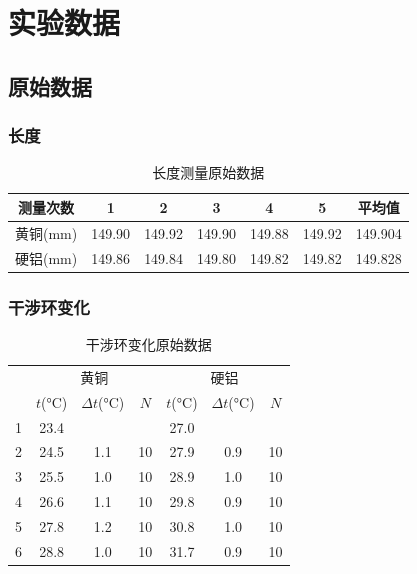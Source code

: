 \documentclass[a4paper,utf8]{article}
\begin{document}
\section{实验数据}
\subsection{原始数据}
\subsubsection{长度}
\begin{table}[!ht]
    \caption{长度测量原始数据}
    \begin{tabular}{*{7}{c}} \toprule
        测量次数 & 1 & 2 & 3 & 4 & 5 & 平均值  \\ \midrule
        黄铜(\unit{\mm}) & 149.90 & 149.92 & 149.90 & 149.88 & 149.92 & 149.904 \\ 
        硬铝(\unit{\mm}) & 149.86 & 149.84 & 149.80 & 149.82 & 149.82 & 149.828 \\ \bottomrule
    \end{tabular}
\end{table}
\subsubsection{干涉环变化}
\begin{table}[!ht]
    \caption{干涉环变化原始数据}
    \begin{tabular}{*{7}{c}}\toprule
        & \multicolumn{3}{c}{黄铜} & \multicolumn{3}{c}{硬铝} \\ 
        & $t$(\unit{\degreeCelsius}) & $\Delta t$(\unit{\degreeCelsius}) & $N$ & $t$(\unit{\degreeCelsius}) & $\Delta t$(\unit{\degreeCelsius}) & $N$  \\ \midrule
       1 & 23.4 &     &    & 27.0 &     &    \\ 
       2 & 24.5 & 1.1 & 10 & 27.9 & 0.9 & 10 \\ 
       3 & 25.5 & 1.0 & 10 & 28.9 & 1.0 & 10 \\ 
       4 & 26.6 & 1.1 & 10 & 29.8 & 0.9 & 10 \\ 
       5 & 27.8 & 1.2 & 10 & 30.8 & 1.0 & 10 \\ 
       6 & 28.8 & 1.0 & 10 & 31.7 & 0.9 & 10 \\ \bottomrule
    \end{tabular}
\end{table}
\end{document}
